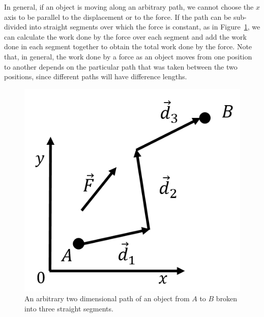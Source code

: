 In general, if an object is moving along an arbitrary path, we cannot choose the $x$ axis to be parallel to the displacement or to the force. If the path can be sub-divided into straight segments over which the force is constant, as in Figure~\ref{fig:workenergy:work2d}, we can calculate the work done by the force over each segment and add the work done in each segment together to obtain the total work done by the force. Note that, in general, the work done by a force as an object moves from one position to another depends on the particular path that was taken between the two positions, since different paths will have difference lengths.

\begin{figure}[!htbp]
\centering
\includegraphics[width=0.4\linewidth]{files/work2d-99959f9f04f1f717440b6952780f6dab.png}
\caption[]{An arbitrary two dimensional path of an object from $A$ to $B$ broken into three straight segments.}
\label{fig:workenergy:work2d}
\end{figure}

